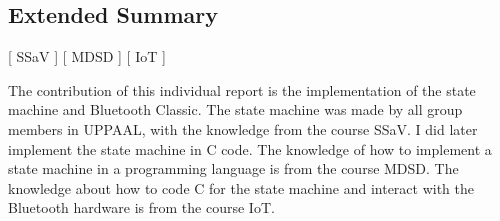 \subsection*{Extended Summary}
[ SSaV ] [ MDSD ] [ IoT ] 
\newline

The contribution of this individual report is the implementation of the state machine and Bluetooth Classic.
The state machine was made by all group members in UPPAAL, with the knowledge from the course SSaV.
I did later implement the state machine in C code.
The knowledge of how to implement a state machine in a programming language is from the course MDSD.
The knowledge about how to code C for the state machine and interact with the Bluetooth hardware is from the course IoT.